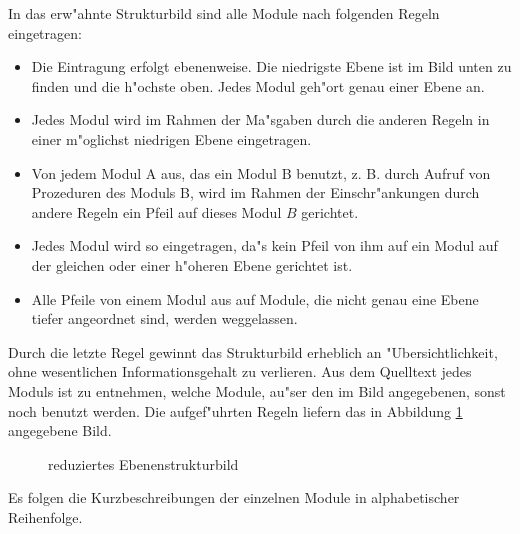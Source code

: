 In das erw"ahnte Strukturbild sind alle Module nach folgenden Regeln
eingetragen:
\begin{itemize}
\item
      Die Eintragung erfolgt ebenenweise. Die niedrigste Ebene ist im
      Bild unten zu finden und die h"ochste oben. Jedes Modul geh"ort 
      genau einer Ebene an.
\item
      Jedes Modul wird im Rahmen der Ma"sgaben durch die anderen Regeln
      in einer m"oglichst niedrigen Ebene eingetragen.
\item
      Von jedem Modul A aus, das ein Modul B benutzt, z. B. durch Aufruf von
      Prozeduren des Moduls B, wird im Rahmen der Einschr"ankungen durch
      andere Regeln ein Pfeil auf dieses Modul $B$ gerichtet.
\item 
      Jedes Modul wird so eingetragen, da"s kein Pfeil von ihm auf ein 
      Modul auf der gleichen oder einer h"oheren Ebene gerichtet ist.
\item
      Alle Pfeile von einem Modul aus auf Module, die nicht genau eine
      Ebene tiefer angeordnet sind, werden weggelassen.
\end{itemize}
Durch die letzte Regel gewinnt das Strukturbild erheblich an
"Ubersichtlichkeit, ohne wesentlichen Informationsgehalt zu verlieren.
Aus dem Quelltext jedes Moduls ist zu entnehmen, welche Module, au"ser
den im Bild angegebenen, sonst noch benutzt werden. Die aufgef"uhrten 
Regeln liefern das in Abbildung \ref{PicModule} angegebene Bild.

\begin{figure}[htb]
\begin{center}
    
    \caption{reduziertes Ebenenstrukturbild}
    \label{PicModule}
\end{center}
\end{figure}

Es folgen die Kurzbeschreibungen der einzelnen Module in alphabetischer 
Reihenfolge.

